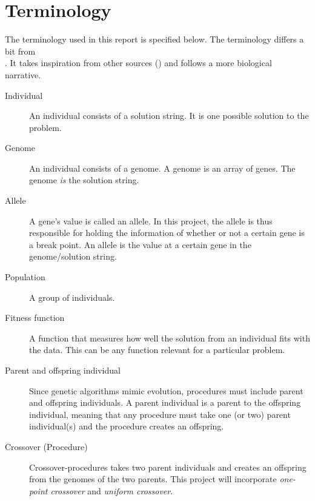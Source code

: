 
\section{Terminology} \label{sec:terminology}

The terminology used in this report is specified below. The terminology differs
a bit from \\ \cite{doerr2017a}. It takes inspiration from other sources
(\cite{thede2014,tutpoint}) and follows a more biological narrative.

\begin{description}

    \item[Individual] An individual consists of a solution string. It is one
    possible solution to the problem. 

    \item[Genome] An individual consists of a genome. A genome is an array of
    genes. The genome \textit{is} the solution string. 

    \item[Allele] A gene's value is called an allele. In this project, the
    allele is thus responsible for holding the information of whether or not a
    certain gene is a break point. An allele is the value at a certain gene in
    the genome/solution string. 

    \item[Population] A group of individuals. 

    \item[Fitness function] A function that measures how well the solution from
    an individual fits with the data. This can be any function relevant for a
    particular problem. 

    \item[Parent and offspring individual] Since genetic algorithms mimic
    evolution, procedures must include parent and offspring individuals. A
    parent individual is a parent to the offspring individual, meaning that any
    procedure must take one (or two) parent individual(s) and the procedure
    creates an offspring. 

    \item[Crossover (Procedure)] Crossover-procedures takes two parent
    individuals and creates an offspring from the genomes of the two parents.
    This project will incorporate \textit{one-point crossover} and
    \textit{uniform crossover}. 
    

\end{description}
